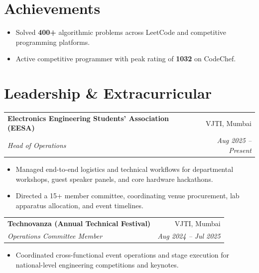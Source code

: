 \documentclass[a4paper,10pt]{article}
\makeatletter
\newcommand{\resumeSubheading}[4]{
  \begin{tabular*}{\textwidth}[t]{l@{\extracolsep{\fill}}r}
    \textbf{#1} & #2 \\
    \textit{\small#3} & \textit{\small #4} \\
  \end{tabular*}
}
\newcommand{\entryGap}{\vspace{2.5pt}}
\makeatother
\begin{document}
\section{Achievements}
\begin{itemize}
    \item Solved \textbf{400+} algorithmic problems across LeetCode and competitive programming platforms.
    \item Active competitive programmer with peak rating of \textbf{1032} on CodeChef.
\end{itemize}

\section{Leadership \& Extracurricular}

\resumeSubheading
  {Electronics Engineering Students' Association (EESA)}{VJTI, Mumbai}
  {Head of Operations}{Aug 2025 -- Present}
\begin{itemize}
    \item Managed end-to-end logistics and technical workflows for departmental workshops, guest speaker panels, and core hardware hackathons.
    \item Directed a 15+ member committee, coordinating venue procurement, lab apparatus allocation, and event timelines.
\end{itemize}

\entryGap
\resumeSubheading
  {Technovanza (Annual Technical Festival)}{VJTI, Mumbai}
  {Operations Committee Member}{Aug 2024 -- Jul 2025}
\begin{itemize}
    \item Coordinated cross-functional event operations and stage execution for national-level engineering competitions and keynotes.
\end{itemize}
\end{document}
